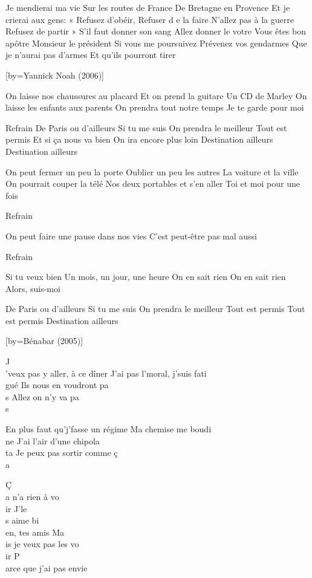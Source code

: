 \beginverse
Je mendierai ma vie
Sur les routes de France
De Bretagne en Provence
Et je crierai aux gens:
« Refusez d'obéir,
Refuser d e la faire
N'allez pas à la guerre
Refusez de partir \! »
S'il faut donner son sang
Allez donner le votre \!
Vous êtes bon apôtre
Monsieur le président
Si vous me poursuivez
Prévenez vos gendarmes
Que je n'aurai pas d'armes
Et qu'ils pourront tirer
\endverse

[by={Yannick Noah (2006)}]

\beginverse
On laisse nos chaussures au placard
Et on prend la guitare
Un CD de Marley
On laisse les enfants aux parents
On prendra tout notre temps
Je te garde pour moi
\endverse

\beginverse
Refrain
De Paris ou d'ailleurs
Si tu me suis
On prendra le meilleur
Tout est permis
Et si ça nous va bien
On ira encore plus loin
Destination ailleurs
Destination ailleurs
\endverse

\beginverse
On peut fermer un peu la porte
Oublier un peu les autres
La voiture et la ville
On pourrait couper la télé
Nos deux portables et s'en aller
Toi et moi pour une fois
\endverse

\beginverse
Refrain
\endverse

\beginverse
On peut faire une pause dans nos vies
C'est peut-être pas mal aussi
\endverse

\beginverse
Refrain
\endverse

\beginverse
Si tu veux bien
Un mois, un jour, une heure
On en sait rien
On en sait rien
Alors, suis-moi
\endverse

\beginverse
De Paris ou d'ailleurs
Si tu me suis
On prendra le meilleur
Tout est permis
Tout est permis
Destination ailleurs
\endverse

[by={Bénabar (2005)}]

\beginverse
J\\[Lam]'veux pas y aller, à ce dîner
J'ai pas l'moral, j'suis fati\\[Fa]gué
Ils nous en voudront pa\\[Mi]s
Allez on n'y va pa\\[Lam]s
\endverse

\beginverse
En plus faut qu'j'fasse un régime
Ma chemise me boudi\\[Fa]ne
J'ai l'air d'une chipola\\[Mi]ta
Je peux pas sortir comme ç\\[Lam]a
\endverse

\beginverse
Ç\\[LA]a n'a rien à vo\\[Rém]ir
J'le\\[Si]s aime bi\\[Mim]en, tes amis
Ma\\[Rém]is je veux pas les vo\\[Do]ir
P\\[Sol]arce que j'ai pas envie
\endverse

